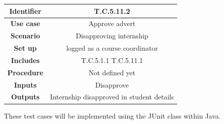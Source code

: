 \documentclass{l3deliverable}
\begin{document}
\begin{tabular}{|c|c|}
\hline \textbf{Identifier} & T.C.5.11.2\\
\hline \textbf{Use case} & Approve advert\\
\hline \textbf{Scenario} & Disapproving internship\\
\hline \textbf{Set up} & logged as a course coordinator\\
\hline \textbf{Includes} & T.C.5.1.1 T.C.5.11.1\\
\hline \textbf{Procedure} & Not defined yet\\
\hline \textbf{Inputs} & Disapprove\\
\hline \textbf{Outputs} & Internship disapproved in student details\\
\hline
\end{tabular}

These test cases will be implemented using the JUnit class within
Java. 
\end{document}

